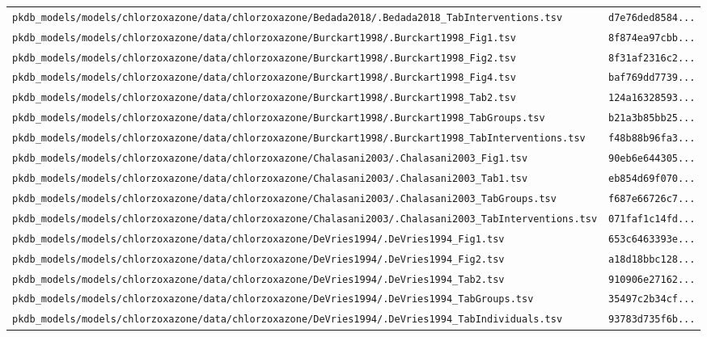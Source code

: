 \documentclass{article}
\begin{document}
\begin{longtable}{ll}
\texttt{pkdb\_models/models/chlorzoxazone/data/chlorzoxazone/Bedada2018/.Bedada2018\_TabInterventions.tsv} & \texttt{d7e76ded8584...} \\
\texttt{pkdb\_models/models/chlorzoxazone/data/chlorzoxazone/Burckart1998/.Burckart1998\_Fig1.tsv} & \texttt{8f874ea97cbb...} \\
\texttt{pkdb\_models/models/chlorzoxazone/data/chlorzoxazone/Burckart1998/.Burckart1998\_Fig2.tsv} & \texttt{8f31af2316c2...} \\
\texttt{pkdb\_models/models/chlorzoxazone/data/chlorzoxazone/Burckart1998/.Burckart1998\_Fig4.tsv} & \texttt{baf769dd7739...} \\
\texttt{pkdb\_models/models/chlorzoxazone/data/chlorzoxazone/Burckart1998/.Burckart1998\_Tab2.tsv} & \texttt{124a16328593...} \\
\texttt{pkdb\_models/models/chlorzoxazone/data/chlorzoxazone/Burckart1998/.Burckart1998\_TabGroups.tsv} & \texttt{b21a3b85bb25...} \\
\texttt{pkdb\_models/models/chlorzoxazone/data/chlorzoxazone/Burckart1998/.Burckart1998\_TabInterventions.tsv} & \texttt{f48b88b96fa3...} \\
\texttt{pkdb\_models/models/chlorzoxazone/data/chlorzoxazone/Chalasani2003/.Chalasani2003\_Fig1.tsv} & \texttt{90eb6e644305...} \\
\texttt{pkdb\_models/models/chlorzoxazone/data/chlorzoxazone/Chalasani2003/.Chalasani2003\_Tab1.tsv} & \texttt{eb854d69f070...} \\
\texttt{pkdb\_models/models/chlorzoxazone/data/chlorzoxazone/Chalasani2003/.Chalasani2003\_TabGroups.tsv} & \texttt{f687e66726c7...} \\
\texttt{pkdb\_models/models/chlorzoxazone/data/chlorzoxazone/Chalasani2003/.Chalasani2003\_TabInterventions.tsv} & \texttt{071faf1c14fd...} \\
\texttt{pkdb\_models/models/chlorzoxazone/data/chlorzoxazone/DeVries1994/.DeVries1994\_Fig1.tsv} & \texttt{653c6463393e...} \\
\texttt{pkdb\_models/models/chlorzoxazone/data/chlorzoxazone/DeVries1994/.DeVries1994\_Fig2.tsv} & \texttt{a18d18bbc128...} \\
\texttt{pkdb\_models/models/chlorzoxazone/data/chlorzoxazone/DeVries1994/.DeVries1994\_Tab2.tsv} & \texttt{910906e27162...} \\
\texttt{pkdb\_models/models/chlorzoxazone/data/chlorzoxazone/DeVries1994/.DeVries1994\_TabGroups.tsv} & \texttt{35497c2b34cf...} \\
\texttt{pkdb\_models/models/chlorzoxazone/data/chlorzoxazone/DeVries1994/.DeVries1994\_TabIndividuals.tsv} & \texttt{93783d735f6b...} \\

\end{longtable}
\end{document}
